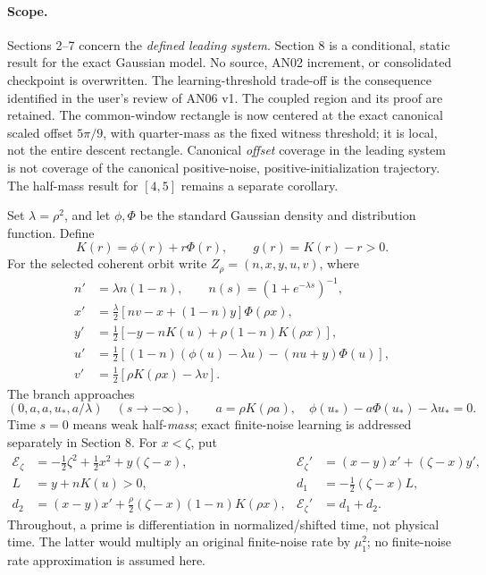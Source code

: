 \documentclass[11pt]{article}
\numberwithin{equation}{section}
\theoremstyle{remark}\newtheorem{remark}[theorem]{Remark}
\newcommand{\1}{\mathbf 1}
\begin{document}
\paragraph{Scope.}
Sections 2--7 concern the \emph{defined leading system}.
Section 8 is a conditional, static result for the exact Gaussian model.
No source, AN02 increment, or consolidated checkpoint is overwritten.
The learning-threshold trade-off is the consequence identified in the
user's review of AN06 v1. The coupled region and its proof are retained.
The common-window rectangle is now centered at the exact canonical scaled
offset $5\pi/9$, with quarter-mass as the fixed witness threshold; it is
local, not the entire descent rectangle. Canonical \emph{offset} coverage
in the leading system is not coverage of the canonical positive-noise,
positive-initialization trajectory. The half-mass result for $[4,5]$
remains a separate corollary.

Set $\lambda=\rho^2$, and let $\phi,\Phi$ be the standard Gaussian density
and distribution function. Define
\[
 K(r)=\phi(r)+r\Phi(r),\qquad g(r)=K(r)-r>0.
\]
For the selected coherent orbit write $Z_\rho=(n,x,y,u,v)$, where
\begin{align}
 n'&=\lambda n(1-n),\qquad n(s)=(1+e^{-\lambda s})^{-1},
 \label{inc:AN06:v2:orbit}\\
 x'&=\tfrac\lambda2[nv-x+(1-n)y]\Phi(\rho x),\nonumber\\
 y'&=\tfrac12[-y-nK(u)+\rho(1-n)K(\rho x)],\nonumber\\
 u'&=\tfrac12[(1-n)(\phi(u)-\lambda u)-(nu+y)\Phi(u)],\nonumber\\
 v'&=\tfrac12[\rho K(\rho x)-\lambda v].\nonumber
\end{align}
The branch approaches
\[
 (0,a,a,u_*,a/\lambda)\quad(s\to-\infty),\qquad
 a=\rho K(\rho a),\quad \phi(u_*)-a\Phi(u_*)-\lambda u_*=0.
\]
Time $s=0$ means weak half-\emph{mass}; exact finite-noise learning is
addressed separately in Section 8.
For $x<\zeta$, put
\begin{align}
 \mathcal E_\zeta&=-\tfrac12\zeta^2+\tfrac12x^2+y(\zeta-x),
 &\mathcal E_\zeta'&=(x-y)x'+(\zeta-x)y',
 \label{inc:AN06:v2:error}\\
 L&=y+nK(u)>0,
 &d_1&=-\tfrac12(\zeta-x)L,\nonumber\\
 d_2&=(x-y)x'+\tfrac\rho2(\zeta-x)(1-n)K(\rho x),
 &\mathcal E_\zeta'&=d_1+d_2.\nonumber
\end{align}
Throughout, a prime is differentiation in normalized/shifted time, not
physical time. The latter would multiply an original finite-noise rate by
$\mu_1^2$; no finite-noise rate approximation is assumed here.
\end{document}
